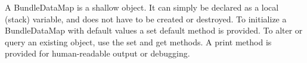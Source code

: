 

A BundleDataMap is a shallow object.  It can simply be declared 
as a local (stack) variable, and does not have
to be created or destroyed.  To initialize a BundleDataMap with default
values a set default method is provided.  To alter or query an existing
object, use the set and get methods.  A print method is provided
for human-readable output or debugging.


